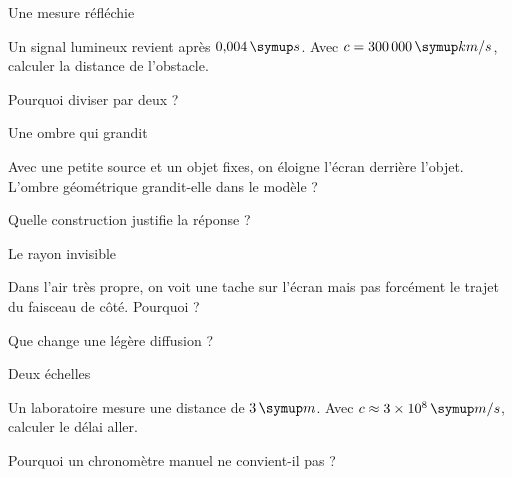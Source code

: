 \clearpage{}
\par\noindent\begin{minipage}{\linewidth}
\begin{exercice}[3]{Une mesure réfléchie}
\begin{questions}
\item Un signal lumineux revient après $0{,}004\unite s$. Avec $c=300\,000\unite{km/s}$, calculer la distance de l’obstacle.
\item Pourquoi diviser par deux ?
\end{questions}
\end{exercice}
\end{minipage}
\par\noindent\begin{minipage}{\linewidth}
\begin{exercice}[3]{Une ombre qui grandit}
\begin{questions}
\item Avec une petite source et un objet fixes, on éloigne l’écran derrière l’objet. L’ombre géométrique grandit-elle dans le modèle ?
\item Quelle construction justifie la réponse ?
\end{questions}
\end{exercice}
\end{minipage}
\clearpage
\par\noindent\begin{minipage}{\linewidth}
\begin{exercice}[3]{Le rayon invisible}
\begin{questions}
\item Dans l’air très propre, on voit une tache sur l’écran mais pas forcément le trajet du faisceau de côté. Pourquoi ?
\item Que change une légère diffusion ?
\end{questions}
\end{exercice}
\end{minipage}
\par\noindent\begin{minipage}{\linewidth}
\begin{exercice}[3]{Deux échelles}
\begin{questions}
\item Un laboratoire mesure une distance de $3\unite m$. Avec $c\approx3\times10^8\unite{m/s}$, calculer le délai aller.
\item Pourquoi un chronomètre manuel ne convient-il pas ?
\end{questions}
\end{exercice}
\end{minipage}
